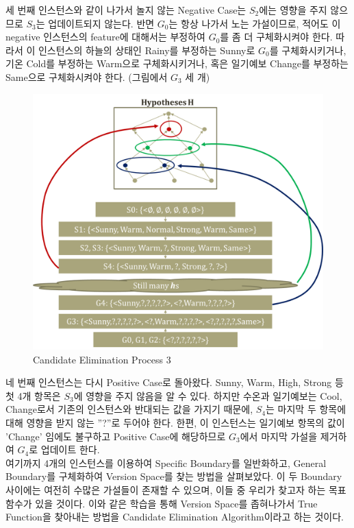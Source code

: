 \documentclass[a4paper]{oblivoir}
\begin{document}
\indent 세 번째 인스턴스와 같이 나가서 놀지 않는 Negative Case는 $S_{2}$에는 영향을 주지 않으므로 $S_{3}$는 업데이트되지 않는다. 반면 $G_{0}$는 항상 나가서 노는 가설이므로, 적어도 이 negative 인스턴스의 feature에 대해서는 부정하여 $G_{0}$를 좀 더 구체화시켜야 한다. 따라서 이 인스턴스의 하늘의 상태인 Rainy를 부정하는 Sunny로 $G_{0}$를 구체화시키거나, 기온 Cold를 부정하는 Warm으로 구체화시키거나, 혹은 일기예보 Change를 부정하는 Same으로 구체화시켜야 한다. (그림에서 $G_{3}$ 세 개) \\
\begin{figure}[ht]
\centering
\includegraphics[scale=0.5]{Candidate_Elimination3.png}
\caption{Candidate Elimination Process 3}
\label{Figure 2-9}
\end{figure}
\indent 네 번째 인스턴스는 다시 Positive Case로 돌아왔다. Sunny, Warm, High, Strong 등 첫 4개 항목은 $S_{3}$에 영향을 주지 않음을 알 수 있다. 하지만 수온과 일기예보는 Cool, Change로서 기존의 인스턴스와 반대되는 값을 가지기 때문에, $S_{4}$는 마지막 두 항목에 대해 영향을 받지 않는 ''?''로 두어야 한다. 한편, 이 인스턴스는 일기예보  항목의 값이 'Change' 임에도 불구하고 Positive Case에 해당하므로 $G_{3}$에서 마지막 가설을 제거하여 $G_{4}$로 업데이트 한다. \\
\indent 여기까지 4개의 인스턴스를 이용하여 Specific Boundary를 일반화하고, General Boundary를 구체화하여 Version Space를 찾는 방법을 살펴보았다. 이 두 Boundary 사이에는 여전히 수많은 가설들이 존재할 수 있으며, 이들 중 우리가 찾고자 하는 목표함수가 있을 것이다. 이와 같은 학습을 통해 Version Space를 좁혀나가서 True Function을 찾아내는 방법을 Candidate Elimination Algorithm이라고 하는 것이다. \\
\end{document}
